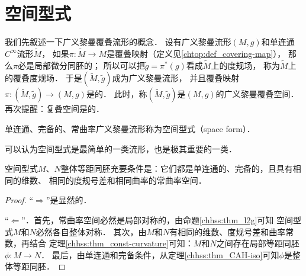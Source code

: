 

\section{空间型式}\label{chhss:sec_SF}

我们先叙述一下广义黎曼覆叠流形的概念．
设有广义黎曼流形$(M,g)$和{\kaishu 单连通}$C^\infty$流形$\widetilde{M}$，
如果$\pi : \widetilde{M} \to M$是覆叠映射（定义见\ref{chtop:def_covering-map}），
那么$\pi$必是局部微分同胚的；
所以可以把$\tilde{g}=\pi^* (g)$看成$\widetilde{M}$上的度规场，
称为$\widetilde{M}$上的{\heiti 覆叠度规场}．
于是$(\widetilde{M},\tilde{g})$成为广义黎曼流形，
并且覆叠映射$\pi: (\widetilde{M},\tilde{g}) \to (M,g)$是的．
此时，称$(\widetilde{M},\tilde{g}) $是$ (M,g)$的{\heiti 广义黎曼覆叠空间}．
再次提醒：复叠空间是的．

\begin{definition}
    单连通、完备的、常曲率广义黎曼流形称为{\heiti 空间型式}（space form）．
\end{definition}

可以认为空间型式是最简单的一类流形，也是极其重要的一类．

\begin{theorem}\label{chhss:thm_CR-iso}
    空间型式$M$、$N$整体等距同胚充要条件是：它们都是单连通的、完备的，且具有相同的维数、
    相同的度规号差和相同曲率的常曲率空间．  
\end{theorem}
\begin{proof}
    “$\Rightarrow$”是显然的．
    
    “$\Leftarrow$”．首先，常曲率空间必然是局部对称的，由命题\ref{chhss:thm_l2g}可知
    空间型式$M$和$N$必然各自整体对称．
    其次，由$M$和$N$有相同的维数、度规号差和曲率常数，再结合
    定理\ref{chhss:thm_const-curvature}可知：$M$和$N$之间存在局部等距同胚$\phi:M\to N$．
    最后，由单连通和完备条件，从定理\ref{chhss:thm_CAH-iso}可知$\phi$是整体等距同胚．
\end{proof}

